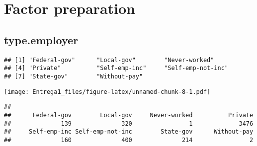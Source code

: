 \documentclass[12pt,]{article}
\newenvironment{Shaded}{\begin{snugshade}}{\end{snugshade}}
\newcommand{\CommentTok}[1]{\textcolor[rgb]{0.56,0.35,0.01}{\textit{#1}}}
\newcommand{\KeywordTok}[1]{\textcolor[rgb]{0.13,0.29,0.53}{\textbf{#1}}}
\newcommand{\NormalTok}[1]{#1}
\newcommand{\OperatorTok}[1]{\textcolor[rgb]{0.81,0.36,0.00}{\textbf{#1}}}
\begin{document}
\hypertarget{factor-preparation}{%
\section{Factor preparation}\label{factor-preparation}}

\hypertarget{type.employer}{%
\subsection{type.employer}\label{type.employer}}

\begin{Shaded}
\end{Shaded}

\begin{verbatim}
## [1] "Federal-gov"      "Local-gov"        "Never-worked"    
## [4] "Private"          "Self-emp-inc"     "Self-emp-not-inc"
## [7] "State-gov"        "Without-pay"
\end{verbatim}

\begin{Shaded}
\end{Shaded}

\texttt{[image: Entrega1\_files/figure-latex/unnamed-chunk-8-1.pdf]}

\begin{Shaded}
\end{Shaded}

\begin{verbatim}
## 
##      Federal-gov        Local-gov     Never-worked          Private 
##              139              320                1             3476 
##     Self-emp-inc Self-emp-not-inc        State-gov      Without-pay 
##              160              400              214                2
\end{verbatim}

\begin{Shaded}
\end{Shaded}
\end{document}
